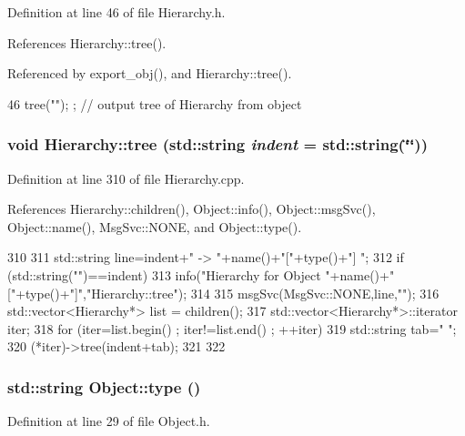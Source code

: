 Definition at line 46 of file Hierarchy.h.

References Hierarchy::tree().

Referenced by export\_\-obj(), and Hierarchy::tree().


\begin{DoxyCode}
46 { tree(""); };                     // output tree of Hierarchy from object
\end{DoxyCode}
\hypertarget{classHierarchy_a76e914b9a677a22a82deb74d892bf261}{
\subsubsection[{tree}]{\setlength{\rightskip}{0pt plus 5cm}void Hierarchy::tree (std::string {\em indent} = {\ttfamily std::string(\char`\"{}\char`\"{})})}}
\label{classHierarchy_a76e914b9a677a22a82deb74d892bf261}


Definition at line 310 of file Hierarchy.cpp.

References Hierarchy::children(), Object::info(), Object::msgSvc(), Object::name(), MsgSvc::NONE, and Object::type().


\begin{DoxyCode}
310                                     {
311   std::string line=indent+" -> "+name()+"["+type()+"] ";
312   if (std::string("")==indent){
313     info("Hierarchy for Object "+name()+"["+type()+"]","Hierarchy::tree");
314   }
315   msgSvc(MsgSvc::NONE,line,"");
316   std::vector<Hierarchy*> list = children();
317   std::vector<Hierarchy*>::iterator iter;
318   for (iter=list.begin() ; iter!=list.end() ; ++iter){
319     std::string tab="  ";
320     (*iter)->tree(indent+tab);
321   }
322 }
\end{DoxyCode}
\hypertarget{classObject_a84f99f70f144a83e1582d1d0f84e4e62}{
\subsubsection[{type}]{\setlength{\rightskip}{0pt plus 5cm}std::string Object::type ()}}
\label{classObject_a84f99f70f144a83e1582d1d0f84e4e62}


Definition at line 29 of file Object.h.

